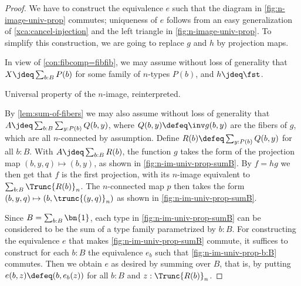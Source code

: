 \begin{proof}
We have to construct the equivalence $e$ such that the diagram
in \cref{fig:n-image-univ-prop} commutes; uniqueness of $e$
follows from an easy generalization of \cref{xca:cancel-injection}
and the left triangle in \cref{fig:n-image-univ-prop}.
To simplify this construction,
we are going to replace $g$ and $h$ by projection maps.

In view of \cref{con:fibcomp=fibfib}, we may assume without
loss of generality that $X\jdeq \sum_{b:B} P(b)$ for some
family of $n$-types $P(b)$, and $h\jdeq\fst$.

\begin{marginfigure}
  \noindent{}
\caption{Universal property of the $n$-image, reinterpreted.}
\label{fig:n-im-univ-prop-sumB}
\end{marginfigure}

By \cref{lem:sum-of-fibers} we may also assume without
loss of generality that
$A\jdeq\sum_{b:B}\sum_{y:P(b)} Q(b,y)$, where
$Q(b,y) \defeq\inv g (b,y)$ are the fibers of $g$,
which are all $n$-connected by assumption.
Define $R(b)\defeq\sum_{y:P(b)} Q(b,y)$ for all $b:B$.
With $A\jdeq \sum_{b:B} R(b)$, the function $g$
takes the form of the projection map $(b,y,q)\mapsto(b,y)$,
as shown in \cref{fig:n-im-univ-prop-sumB}.
By $f=hg$ we then get that $f$ is the first projection,
with its $n$-image equivalent to $\sum_{b:B} \Trunc{R(b)}_n$.
The $n$-connected map $p$ then takes the form
$(b,y,q)\mapsto(b,\trunc{(y,q)}_n)$ as shown in
\cref{fig:n-im-univ-prop-sumB}.

Since $B=\sum_{b:B}\bn{1}$, each type in \cref{fig:n-im-univ-prop-sumB}
can be considered to be the sum of a type family parametrized by $b:B$.
For constructing the equivalence $e$ that makes
\cref{fig:n-im-univ-prop-sumB} commute, it suffices to
construct for each $b:B$ the equivalence $e_b$ such that
\cref{fig:n-im-univ-prop-b:B} commutes.
Then we obtain $e$ as desired by summing over $B$, that is,
by putting $e(b,z) \defeq (b,e_b(z))$ for all $b:B$ and $z:\Trunc{R(b)}_n$.


\end{proof}
